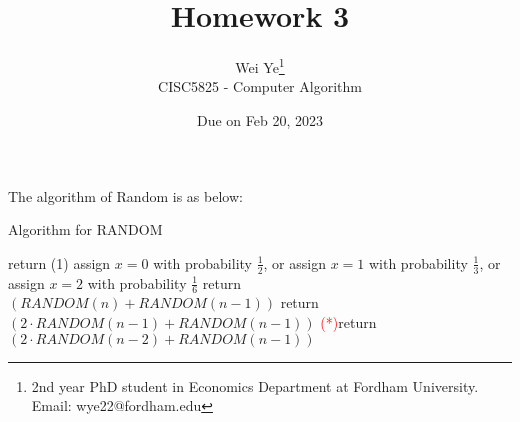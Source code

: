 \documentclass[11pt]{article} %
\title{Homework 3}
\author{Wei Ye\footnote{2nd year PhD student in Economics Department at Fordham University. Email: wye22@fordham.edu}
    \\ CISC5825 - Computer Algorithm}
\date{Due on Feb 20, 2023}
\begin{document}
\maketitle

The algorithm of Random is as below:
 \begin{algorithm}
    \caption{Algorithm for RANDOM}\label{alg:cap}
    \begin{algorithmic}
            \State return (1)
        \Else 
            \State assign $x = 0$ with probability $\frac{1}{2}$, or assign $x = 1$ with probability $\frac{1}{3}$, or assign 
            $x = 2$ with probability $\frac{1}{6}$
                \State return $(RANDOM(n)+RANDOM(n-1))$
            \EndIf
                \State return $(2\cdot RANDOM(n-1)+RANDOM(n-1))$
            \EndIf
                \State  \textcolor{red}{(*)}return $(2\cdot RANDOM(n-2)+RANDOM(n-1))$
            \EndIf
        \EndIf
    \EndProcedure
    \end{algorithmic}
    \end{algorithm}
\end{document}
